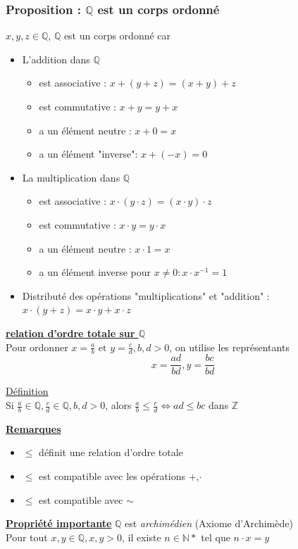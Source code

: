 \documentclass[12pt,a4paper]{article}
\newcommand{\evid}[1]{\textbf{\underline{#1}}}
\newcommand{\N}{\ensuremath{\mathbb{N}} }
\newcommand{\Z}{\ensuremath{\mathbb{Z}} }
\newcommand{\Q}{\ensuremath{\mathbb{Q}} }
\newcommand{\et}{\mbox{ et }}
\newcommand{\Definition}{\underline{Définition} }
\begin{document}
\subsubsection{Proposition : $\mathbb{Q}$ est un corps ordonné}
$x,y,z \in \Q$, \Q est un corps ordonné car
{\setlength{\baselineskip}{5pt}
\begin{itemize}
	\item L'addition dans \Q 
		\begin{itemize}
			\item est associative :  $x+(y+z)=(x+y)+z$
			\item est commutative : $x+y = y+x$
			\item a un élément neutre : $x + 0 = x$
			\item a un élément "inverse": $x+ (-x) = 0$
		\end{itemize}
	\item La multiplication dans \Q
		\begin{itemize}
			\item est associative :  $x\cdot(y\cdot z)=(x\cdot y)\cdot z$
			\item est commutative : $x\cdot y = y\cdot x$
			\item a un élément neutre : $x \cdot 1 = x$
			\item a un élément  inverse pour $x \neq 0: x\cdot x^{-1} = 1$
		\end{itemize}
	\item Distributé des opérations "multiplications" et "addition" : \\
			$x\cdot (y+z) = x \cdot y + x \cdot z$
\end{itemize}}
\evid{relation d'ordre totale sur $\mathbb{Q}$}\\
Pour ordonner $x = \frac{a}{b} \et y = \frac{c}{d}, b,d > 0$, on utilise les représentants 
\begin{equation}
	x = \frac{ad}{bd}, y = \frac{bc}{bd}
\end{equation}
\begin{boite}[0.8]
	\Definition\\
	Si $\frac{a}{b} \in \Q, \frac{c}{d}\in \Q, b,d > 0$, alors $\frac{a}{b} \leq \frac{c}{d} \iff ad \leq bc$ dans \Z
\end{boite}
\evid{Remarques}
\begin{itemize}
	\item $\leq$ définit une relation d'ordre totale
	\item $\leq$ est compatible avec les opérations +,$\cdot$
	\item $\leq$ est compatible avec $\sim$
\end{itemize}
\evid{Propriété importante} \Q est \textit{archimédien} (Axiome d'Archimède)\\
Pour tout $x,y \in \Q, x,y > 0$, il existe $n \in \N*$ tel que $n\cdot x = y$
\end{document}
